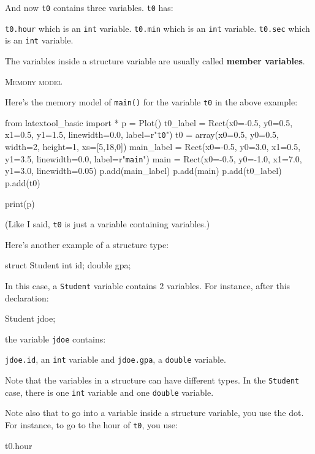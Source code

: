 And now \verb!t0! contains three variables. \verb!t0! has:
\begin{tightlist}
  \li \verb!t0.hour! which is an \verb!int! variable.
  \li \verb!t0.min! which is an \verb!int! variable.
  \li \verb!t0.sec! which is an \verb!int! variable.
\end{tightlist}

The variables inside a structure variable are usually called
\textbf{member variables}.

\textsc{Memory model}

Here's the memory model of \verb!main()! for the variable \verb!t0! in the
above example:
\begin{python}
from latextool_basic import *
p = Plot()
t0_label = Rect(x0=-0.5, y0=0.5, x1=0.5, y1=1.5, linewidth=0.0, label=r"\texttt{t0}")
t0 = array(x0=0.5, y0=0.5, width=2, height=1, xs=[5,18,0])
main_label = Rect(x0=-0.5, y0=3.0, x1=0.5, y1=3.5, linewidth=0.0, label=r"\texttt{main}")
main = Rect(x0=-0.5, y0=-1.0, x1=7.0, y1=3.0, linewidth=0.05)
p.add(main_label)
p.add(main)
p.add(t0_label)
p.add(t0)

print(p)
\end{python}

(Like I said, \verb!t0! is just a variable containing variables.)

Here's another example of a structure type:
\begin{console}
struct Student
{
    int id;
    double gpa;
}
\end{console}

In this case, a \verb!Student! variable contains $2$ variables. For instance,
after this declaration:
\begin{console}
Student jdoe;
\end{console}
the variable \verb!jdoe! contains:
\begin{tightlist}
  \li \verb!jdoe.id!, an \verb!int! variable and
  \li \verb!jdoe.gpa!, a \verb!double! variable.
\end{tightlist}

Note that the variables in a structure can have different types. In the
\verb!Student! case, there is one \verb!int! variable and one \verb!double!
variable.

Note also that to go into a variable inside a structure variable, you use the
dot. For instance, to go to the hour of \verb!t0!, you use:
\begin{console}
t0.hour
\end{console}


